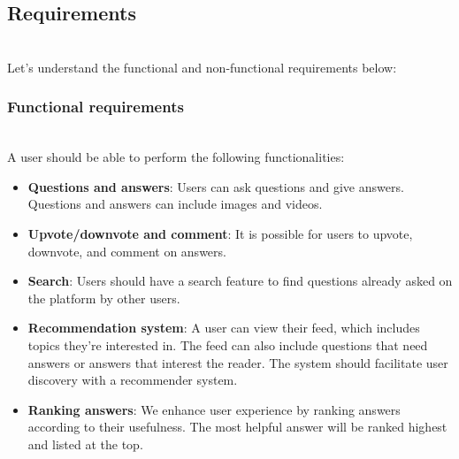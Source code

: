 

\subsection{Requirements}\label{pf-ig1Ag6_Dx3YeAi0cfq}
\\
Let's understand the functional and non-functional requirements below:\\

\subsubsection{Functional requirements}\label{0gybILG6eeWRVpIQLXtMn}
\\
A user should be able to perform the following functionalities:

\begin{itemize}
\item
\protect{}\label{g69vNOuK69x6aF30E1pYx}
\textbf{Questions and answers}: Users can ask questions and give answers. Questions and answers can include images and videos.
\item
\protect{}\label{NHDycTTbdMpciU7GoG5xi}
\textbf{Upvote/downvote and comment}: It is possible for users to upvote, downvote, and comment on answers.
\item
\protect{}\label{5D9gFDpOkp6QT2uWba01S}
\textbf{Search}: Users should have a search feature to find questions already asked on the platform by other users.
\item
\protect{}\label{tCEYFaHDI2VPEkAXt3NOz}
\textbf{Recommendation system}: A user can view their feed, which includes topics they're interested in. The feed can also include questions that need answers or answers that interest the reader. The system should facilitate user discovery with a recommender system.
\item
\protect{}\label{Wgk4bHIKS432dLflJ1rFm}
\textbf{Ranking answers}: We enhance user experience by ranking answers according to their usefulness. The most helpful answer will be ranked highest and listed at the top.
\end{itemize}

